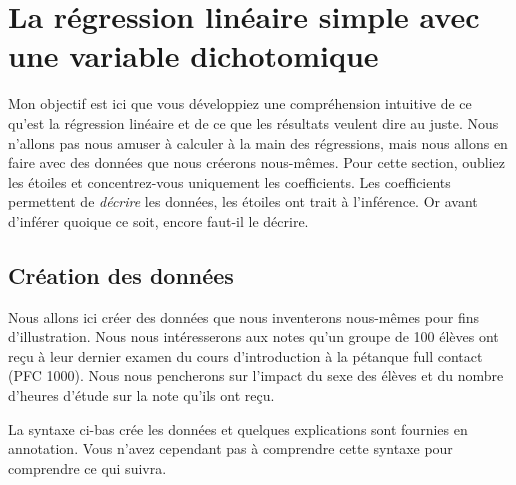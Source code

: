\documentclass[
]{book}
\begin{document}
\hypertarget{la-ruxe9gression-linuxe9aire-simple-avec-une-variable-dichotomique}{%
\section{La régression linéaire simple avec une variable dichotomique}\label{la-ruxe9gression-linuxe9aire-simple-avec-une-variable-dichotomique}}

Mon objectif est ici que vous développiez une compréhension intuitive de ce qu'est la régression linéaire et de ce que les résultats veulent dire au juste. Nous n'allons pas nous amuser à calculer à la main des régressions, mais nous allons en faire avec des données que nous créerons nous-mêmes. Pour cette section, oubliez les étoiles et concentrez-vous uniquement les coefficients. Les coefficients permettent de \emph{décrire} les données, les étoiles ont trait à l'inférence. Or avant d'inférer quoique ce soit, encore faut-il le décrire.

\hypertarget{cruxe9ation-des-donnuxe9es}{%
\subsection{Création des données}\label{cruxe9ation-des-donnuxe9es}}

Nous allons ici créer des données que nous inventerons nous-mêmes pour fins d'illustration. Nous nous intéresserons aux notes qu'un groupe de 100 élèves ont reçu à leur dernier examen du cours d'introduction à la pétanque full contact (PFC 1000). Nous nous pencherons sur l'impact du sexe des élèves et du nombre d'heures d'étude sur la note qu'ils ont reçu.

La syntaxe ci-bas crée les données et quelques explications sont fournies en annotation. Vous n'avez cependant pas à comprendre cette syntaxe pour comprendre ce qui suivra.
\end{document}

